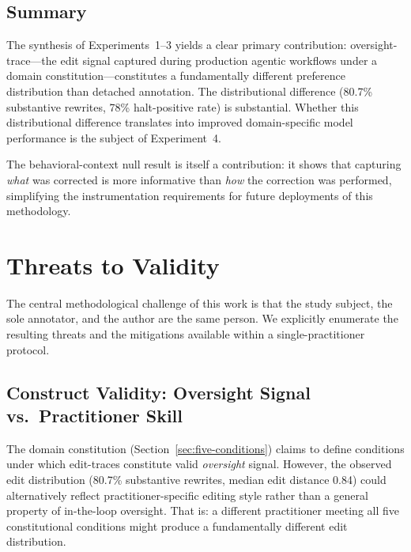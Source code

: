 \documentclass[11pt]{article}
\begin{document}
\subsection{Summary}

The synthesis of Experiments~1--3 yields a clear primary contribution: oversight-trace---the edit signal captured during production agentic workflows under a domain constitution---constitutes a fundamentally different preference distribution than detached annotation.
The distributional difference (80.7\% substantive rewrites, 78\% halt-positive rate) is substantial.
Whether this distributional difference translates into improved domain-specific model performance is the subject of Experiment~4.

The behavioral-context null result is itself a contribution: it shows that capturing \emph{what} was corrected is more informative than \emph{how} the correction was performed, simplifying the instrumentation requirements for future deployments of this methodology.



\section{Threats to Validity}
\label{sec:threats}

The central methodological challenge of this work is that the study subject, the sole annotator, and the author are the same person.
We explicitly enumerate the resulting threats and the mitigations available within a single-practitioner protocol.

\subsection{Construct Validity: Oversight Signal vs.\ Practitioner Skill}

The domain constitution (Section~\ref{sec:five-conditions}) claims to define conditions under which edit-traces constitute valid \emph{oversight} signal.
However, the observed edit distribution (80.7\% substantive rewrites, median edit distance 0.84) could alternatively reflect practitioner-specific editing style rather than a general property of in-the-loop oversight.
That is: a different practitioner meeting all five constitutional conditions might produce a fundamentally different edit distribution.
\end{document}
